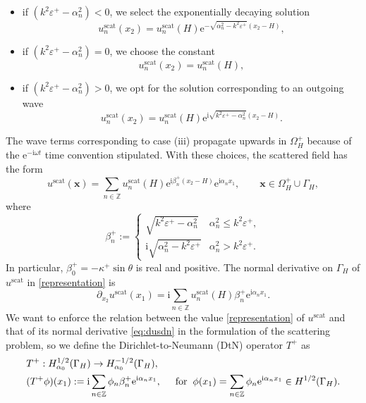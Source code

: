 \documentclass[a4paper,10pt]{article}
\newcommand{\IZ}{{\mathbb Z}}
\newcommand{\bx}{{\mathbf x}}
\newcommand{\ri}{{\mathrm i}}
\newcommand{\re}{{\mathrm e}}
\newcommand{\scat}{{\mathrm{scat}}}
\newcommand{\dxt}{{\partial_{x_2}}}
\newcommand{\GH}{{\Gamma_H}}
\begin{document}
\begin{itemize}
\item[(i)] if $(k^2 \varepsilon^+ - \alpha^2_n)<0$, we select the exponentially decaying solution
\begin{equation*}
	u^\scat_n(x_2) = u_n^\scat(H) \re^{-\sqrt{\alpha^2_n-k^2 \varepsilon^+}(x_2-H)},
\end{equation*}
\item[(ii)] if $(k^2 \varepsilon^+ - \alpha^2_n)=0$, we choose the constant
\begin{equation*}
	u^\scat_n(x_2) = u_n^\scat(H),
\end{equation*}
\item[(iii)] if $(k^2 \varepsilon^+ - \alpha^2_n)>0$, we opt for the solution corresponding to an outgoing wave
\begin{equation*}
	u^\scat_n(x_2) = u_n^\scat(H) \re^{\ri\sqrt{k^2 \varepsilon^+-\alpha^2_n}(x_2-H)}.
\end{equation*}
\end{itemize}
The wave terms corresponding to case (iii) propagate upwards in $\Omega_H^+$ because of the $\re^{-\ri\omega t}$ time convention stipulated.
With these choices, the scattered field has the form
\begin{equation} \label{representation}
u^\scat(\bx)=\sum_{n\in\mathbb{Z}} u^\scat_n(H)\re^{\ri\beta_n^+ (x_2-H)} \re^{\ri\alpha_n x_1},    \qquad \bx\in\Omega_H^+ \cup \GH,
\end{equation}
where
\begin{equation} \label{beta_piu}
\beta_n^+ := \begin{cases} \sqrt{k^2\varepsilon^+-\alpha_n^2} & \alpha_n^2 \leq k^2\varepsilon^+, \\ 
	\ri\sqrt{\alpha_n^2-k^2\varepsilon^+} & \alpha_n^2 > k^2\varepsilon^+. \end{cases} 
	\end{equation}
	In particular, $\beta_0^+=-\kappa^+\sin\theta$ is real and positive.
	The normal derivative on $\GH$ of $u^\scat$ in \eqref{representation} is
	\begin{equation}\label{eq:dusdn}
\dxt u^\scat (x_1)
= \ri\sum_{n\in\mathbb{Z}} u^\scat_n(H) \beta_n^+ \re^{\ri\alpha_nx_1}.
\end{equation}
We want to enforce the relation between the value \eqref{representation} of $u^\scat$ and that of its normal derivative \eqref{eq:dusdn} in the formulation of the scattering problem,
so we define the Dirichlet-to-Neumann (DtN) operator $T^+$ as
\begin{align} \label{DtN}
& T^+:H^{1/2}_{\alpha_0}(\GH) \to H^{-1/2}_{\alpha_0}(\GH), \\ \nonumber
& (T^+\phi)(x_1) := \ri \sum_{n\in\mathbb{Z}} \phi_n \beta_n^+\re^{\ri\alpha_nx_1}, 
\hspace{0.5cm} \text{for} \hspace{0.2cm} 
\phi(x_1)=\sum_{n\in\IZ}\phi_n \re^{\ri\alpha_nx_1} \in H^{1/2}(\GH).
\end{align}
\end{document}
